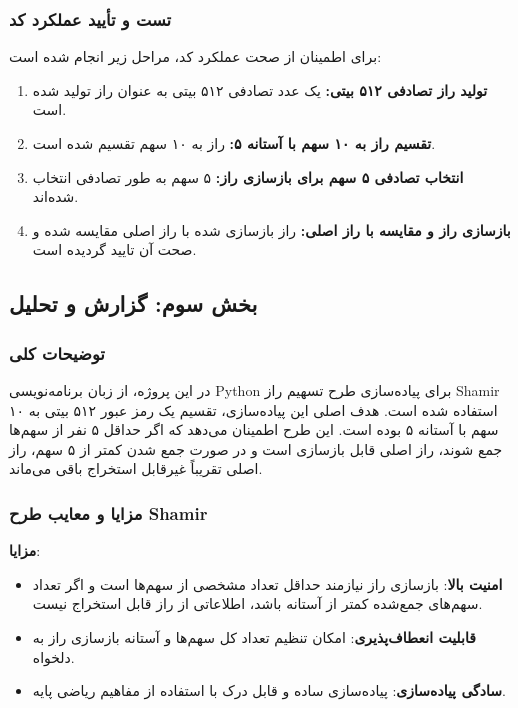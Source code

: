 \documentclass{report}
\begin{document}
\subsubsection*{تست و تأیید عملکرد کد}
برای اطمینان از صحت عملکرد کد، مراحل زیر انجام شده است:
\begin{enumerate}
	\item \textbf{تولید راز تصادفی ۵۱۲ بیتی:} یک عدد تصادفی ۵۱۲ بیتی به عنوان راز تولید شده است.
	\item \textbf{تقسیم راز به ۱۰ سهم با آستانه ۵:} راز به ۱۰ سهم تقسیم شده است.
	\item \textbf{انتخاب تصادفی ۵ سهم برای بازسازی راز:} ۵ سهم به طور تصادفی انتخاب شده‌اند.
	\item \textbf{بازسازی راز و مقایسه با راز اصلی:} راز بازسازی شده با راز اصلی مقایسه شده و صحت آن تایید گردیده است.
\end{enumerate}

\subsection*{بخش سوم: گزارش و تحلیل}

\subsubsection*{توضیحات کلی}
 در این پروژه، از زبان برنامه‌نویسی Python برای پیاده‌سازی طرح تسهیم راز Shamir استفاده شده است. هدف اصلی این پیاده‌سازی، تقسیم یک رمز عبور ۵۱۲ بیتی به ۱۰ سهم با آستانه ۵ بوده است. این طرح اطمینان می‌دهد که اگر حداقل ۵ نفر از سهم‌ها جمع شوند، راز اصلی قابل بازسازی است و در صورت جمع شدن کمتر از ۵ سهم، راز اصلی تقریباً غیرقابل استخراج باقی می‌ماند.

\subsubsection*{مزایا و معایب طرح Shamir}
 \textbf{مزایا}:
\begin{itemize}
	\item \textbf{امنیت بالا}:
	      بازسازی راز نیازمند حداقل تعداد مشخصی از سهم‌ها است و اگر تعداد سهم‌های جمع‌شده کمتر از آستانه باشد، اطلاعاتی از راز قابل استخراج نیست.
	\item \textbf{قابلیت انعطاف‌پذیری}:
	      امکان تنظیم تعداد کل سهم‌ها و آستانه بازسازی راز به دلخواه.
	\item \textbf{سادگی پیاده‌سازی}:
	      پیاده‌سازی ساده و قابل درک با استفاده از مفاهیم ریاضی پایه.
\end{itemize}
\end{document}
